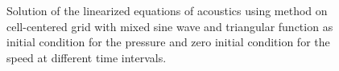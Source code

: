\begin{figure}[]
     \caption{Solution of the linearized equations of acoustics using \protect{\lw} method on cell-centered grid with mixed sine wave and triangular function as initial condition for the pressure and zero initial condition for the speed at different time intervals.}
   \label{fig:sol_sin_tri}
\end{figure} 

